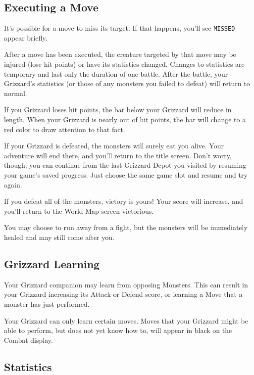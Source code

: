 \documentclass[10pt,twocolumn,openany,article]{memoir}
\begin{document}
\subsection{Executing a Move}

It's possible for a move to miss its target. If that happens, you'll see
\texttt{MISSED} appear briefly.

After a move  has been executed, the creature targeted  by that move may
be injured (lose hit points) or  have its statistics changed. Changes to
statistics  are temporary  and last  only  the duration  of one  battle.
After the battle,  your Grizzard's statistics (or those  of any monsters
you failed to defeat) will return to normal.

If  you Grizzard  loses hit  points, the  bar below  your Grizzard  will
reduce in  length. When your Grizzard  is nearly out of  hit points, the
bar will change to a red color to draw attention to that fact.

If your  Grizzard is defeated, the  monsters will surely eat  you alive.
Your adventure  will end there, and  you'll return to the  title screen.
Don't worry, though;  you can continue from the last  Grizzard Depot you
visited by  resuming your  game's saved progress.  Just choose  the same
game slot and resume and try again.

If you  defeat all of  the monsters, victory  is yours! Your  score will
increase, and you'll return to the World Map screen victorious.

You  may choose  to run  away from  a fight,  but the  monsters will  be
immediately healed and may still come after you.

\subsection{Grizzard Learning}

Your  Grizzard companion  may  learn from  opposing  Monsters. This  can
result  in your  Grizzard  increasing  its Attack  or  Defend score,  or
learning a Move that a monster has just performed.

Your Grizzard  can only  learn certain moves.  Moves that  your Grizzard
might be able to  perform, but does not yet know how  to, will appear in
black on the Combat display.

\subsection{Statistics}
\end{document}
